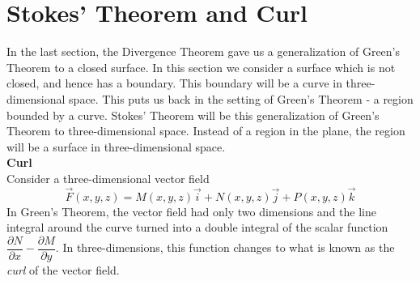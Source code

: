\section{Stokes' Theorem and Curl}\label{sec:stokes_theorem}

In the last section, the Divergence Theorem gave us a generalization of Green's Theorem to a closed surface. In this section we consider a surface which is not closed, and hence has a boundary.  This boundary will be a curve in three-dimensional space. This puts us back in the setting of Green's Theorem - a region bounded by a curve. Stokes' Theorem will be this generalization of Green's Theorem to three-dimensional space. Instead of a region in the plane, the region will be a surface in three-dimensional space.\\

\noindent\textbf{\large Curl}\\

Consider a three-dimensional vector field $$\vec F(x,y,z) = M(x,y,z) \vec i + N(x,y,z) \vec j + P(x,y,z) \vec k$$ In Green's Theorem, the vector field had only two dimensions and the line integral around the curve turned into a double integral of the scalar function $\dfrac{\partial N}{\partial x} - \dfrac{\partial M}{\partial y}$.  In three-dimensions, this function changes to what is known as the \emph{curl} of the vector field. \\

\\

